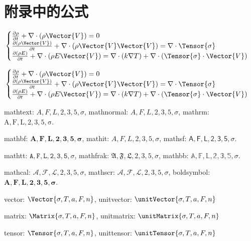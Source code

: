 \setcounter{app_fig}{1}
\setcounter{app_tab}{1}
\setcounter{equation}{0}
\renewcommand\theequation{附\arabic{app}-\arabic{equation}}
\renewcommand\chaptername{附录}
\renewcommand\chaptername{Appendix} 
\renewcommand\thechapter{附录\zhnum{app}} 

\setcounter{chapter}{0}
\setcounter{section}{0}
\chapter{附录中的公式}\label{chap:app1}{

\begin{equation} \label{eq:appedns}
    \begin{cases}
        \frac{\partial \rho}{\partial t} + \nabla\cdot(\rho\Vector{V}) = 0\\
        \frac{\partial (\rho\Vector{V})}{\partial t} + \nabla\cdot(\rho\Vector{V}\Vector{V}) = \nabla\cdot\Tensor{\sigma}\\
        \frac{\partial (\rho E)}{\partial t} + \nabla\cdot(\rho E\Vector{V}) = \nabla\cdot(k\nabla T) + \nabla\cdot(\Tensor{\sigma}\cdot\Vector{V})
    \end{cases}
\end{equation}

\begin{equation} \label{eq:appedns2}
    \begin{cases}
        \frac{\partial \rho}{\partial t} + \nabla\cdot(\rho\Vector{V}) = 0\\
        \frac{\partial (\rho\Vector{V})}{\partial t} + \nabla\cdot(\rho\Vector{V}\Vector{V}) = \nabla\cdot\Tensor{\sigma}\\
        \frac{\partial (\rho E)}{\partial t} + \nabla\cdot(\rho E\Vector{V}) = \nabla\cdot(k\nabla T) + \nabla\cdot(\Tensor{\sigma}\cdot\Vector{V})
    \end{cases}
\end{equation}


mathtext: $A,F,L,2,3,5,\sigma$, mathnormal: $A,F,L,2,3,5,\sigma$, mathrm: $\mathrm{A,F,L,2,3,5,\sigma}$.

mathbf: $\mathbf{A,F,L,2,3,5,\sigma}$, mathit: $\mathit{A,F,L,2,3,5,\sigma}$, mathsf: $\mathsf{A,F,L,2,3,5,\sigma}$.

mathtt: $\mathtt{A,F,L,2,3,5,\sigma}$, mathfrak: $\mathfrak{A,F,L,2,3,5,\sigma}$, mathbb: $\mathbb{A,F,L,2,3,5,\sigma}$.

mathcal: $\mathcal{A,F,L,2,3,5,\sigma}$, mathscr: $\mathscr{A,F,L,2,3,5,\sigma}$, boldsymbol: $\boldsymbol{A,F,L,2,3,5,\sigma}$.

vector: $\Vector{\sigma, T, a, F, n}$, unitvector: $\unitVector{\sigma, T, a, F, n}$

matrix: $\Matrix{\sigma, T, a, F, n}$, unitmatrix: $\unitMatrix{\sigma, T, a, F, n}$

tensor: $\Tensor{\sigma, T, a, F, n}$, unittensor: $\unitTensor{\sigma, T, a, F, n}$ 

\cleardoublepage[plain]
}